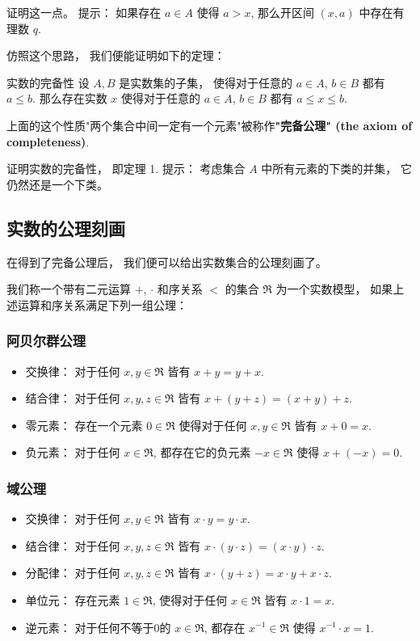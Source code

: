 \begin{exercise}{}
证明这一点。 提示： 如果存在 $a\in A$ 使得 $a>x$, 那么开区间 $(x,a)$ 中存在有理数 $q$.
\end{exercise}

仿照这个思路， 我们便能证明如下的定理：

\begin{theorem}{实数的完备性}\label{the_Cmplt_1}
设 $A,B$ 是实数集的子集， 使得对于任意的 $a\in A$, $b\in B$ 都有 $a\leq b$. 那么存在实数 $x$ 使得对于任意的 $a\in A$, $b\in B$ 都有 $a\leq x\leq b$.
\end{theorem}

上面的这个性质"两个集合中间一定有一个元素"被称作\textbf{"完备公理" (the axiom of completeness)}.

\begin{exercise}{}
证明实数的完备性， 即定理 1. 提示： 考虑集合 $A$ 中所有元素的下类的并集， 它仍然还是一个下类。
\end{exercise}

\subsection{实数的公理刻画}

在得到了完备公理后， 我们便可以给出实数集合的公理刻画了。 

我们称一个带有二元运算 $+$, $\cdot$ 和序关系 $<$ 的集合 $\mathfrak{R}$ 为一个实数模型， 如果上述运算和序关系满足下列一组公理：

\subsubsection{阿贝尔群公理}
\begin{itemize}
\item 交换律： 对于任何 $x,y\in\mathfrak{R}$ 皆有 $x+y=y+x$.
\item 结合律： 对于任何 $x,y,z\in\mathfrak{R}$ 皆有 $x+(y+z)=(x+y)+z$.
\item 零元素： 存在一个元素 $0\in \mathfrak{R}$ 使得对于任何 $x,y\in\mathfrak{R}$ 皆有 $x+0=x$.
\item 负元素： 对于任何 $x\in\mathfrak{R}$, 都存在它的负元素 $-x\in\mathfrak{R}$ 使得 $x+(-x)=0$.
\end{itemize}

\subsubsection{域公理}
\begin{itemize}
\item 交换律： 对于任何 $x,y\in\mathfrak{R}$ 皆有 $x\cdot y=y\cdot x$.
\item 结合律： 对于任何 $x,y,z\in\mathfrak{R}$ 皆有 $x\cdot (y\cdot z)=(x\cdot y)\cdot z$.
\item 分配律： 对于任何 $x,y,z\in\mathfrak{R}$ 皆有 $x\cdot (y+z)=x\cdot y+x\cdot z$.
\item 单位元： 存在元素 $1\in\mathfrak{R}$, 使得对于任何 $x\in\mathfrak{R}$ 皆有 $x\cdot 1=x$.
\item 逆元素： 对于任何不等于0的 $x\in\mathfrak{R}$, 都存在 $x^{-1}\in\mathfrak{R}$ 使得 $x^{-1}\cdot x=1$.
\end{itemize}

